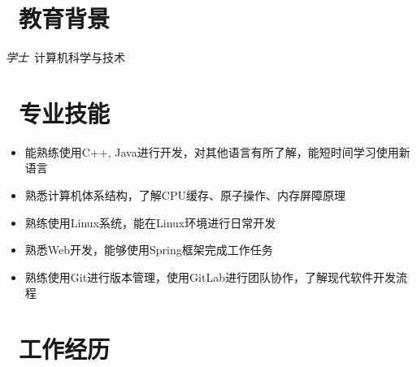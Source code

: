 \documentclass{resume}
\begin{document}



\section{\texorpdfstring{\faGraduationCap\ 教育背景}{教育背景}}
\textit{学士}\ 计算机科学与技术

\section{\texorpdfstring{\faCogs\ 专业技能}{专业技能}}
\begin{itemize}[parsep=0.5ex]
  \item 能熟练使用C++, Java进行开发，对其他语言有所了解，能短时间学习使用新语言
  \item 熟悉计算机体系结构，了解CPU缓存、原子操作、内存屏障原理
  \item 熟练使用Linux系统，能在Linux环境进行日常开发
  \item 熟悉Web开发，能够使用Spring框架完成工作任务
  \item 熟练使用Git进行版本管理，使用GitLab进行团队协作，了解现代软件开发流程
\end{itemize}

\section{\texorpdfstring{\faUsers\ 工作经历}{工作经历}}
\end{document}
